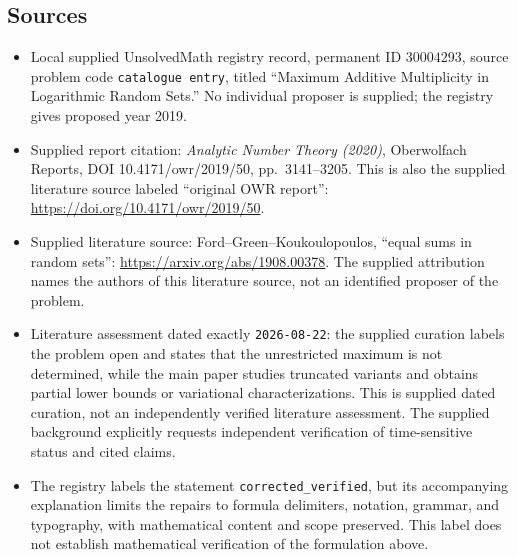 \documentclass[11pt]{article}
\begin{document}
\subsection{Sources}
\begin{itemize}
\item Local supplied UnsolvedMath registry record, permanent ID \(30004293\), source problem code \texttt{catalogue entry}, titled ``Maximum Additive Multiplicity in Logarithmic Random Sets.'' No individual proposer is supplied; the registry gives proposed year 2019.
\item Supplied report citation: \emph{Analytic Number Theory (2020)}, Oberwolfach Reports, DOI 10.4171/owr/2019/50, pp.\ 3141--3205. This is also the supplied literature source labeled ``original OWR report'': \url{https://doi.org/10.4171/owr/2019/50}.
\item Supplied literature source: Ford--Green--Koukoulopoulos, ``equal sums in random sets'': \url{https://arxiv.org/abs/1908.00378}. The supplied attribution names the authors of this literature source, not an identified proposer of the problem.
\item Literature assessment dated exactly \texttt{2026-08-22}: the supplied curation labels the problem open and states that the unrestricted maximum is not determined, while the main paper studies truncated variants and obtains partial lower bounds or variational characterizations. This is supplied dated curation, not an independently verified literature assessment. The supplied background explicitly requests independent verification of time-sensitive status and cited claims.
\item The registry labels the statement \texttt{corrected\_verified}, but its accompanying explanation limits the repairs to formula delimiters, notation, grammar, and typography, with mathematical content and scope preserved. This label does not establish mathematical verification of the formulation above.
\end{itemize}
\end{document}
